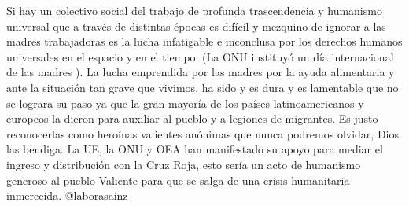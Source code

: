 \documentclass{article}%
\begin{document}
\newline%
%
Si hay un colectivo social del trabajo de profunda   trascendencia y humanismo  universal que a través de distintas épocas es difícil y mezquino de ignorar  a las madres trabajadoras es la lucha infatigable e inconclusa  por los derechos humanos universales  en el espacio y en el tiempo. (La ONU instituyó  un día internacional de las madres ).%
\newline%
%
La lucha emprendida por las madres por la ayuda alimentaria  y ante  la situación  tan  grave  que vivimos, ha sido  y  es dura y es lamentable  que no se lograra su paso ya que la gran  mayoría de los países latinoamericanos  y europeos  la dieron para auxiliar al pueblo y a legiones de migrantes. Es justo reconocerlas como  heroínas valientes anónimas que  nunca podremos olvidar, Dios las  bendiga.%
\newline%
%
La UE, la ONU y OEA han manifestado su apoyo para mediar el  ingreso y distribución con la Cruz Roja, esto  sería  un acto de humanismo   generoso al  pueblo Valiente  para que se salga de una crisis humanitaria inmerecida.%
\newline%
%
@laborasainz%
\newline%
%
\end{document}

